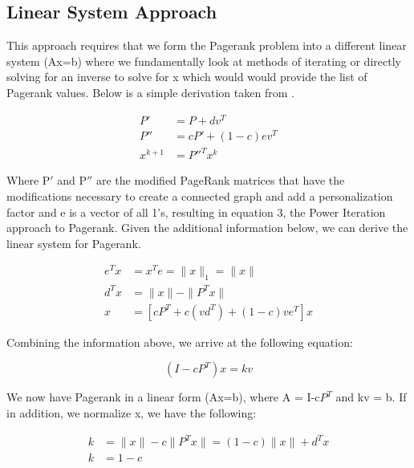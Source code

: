 \documentclass[letterpaper,11pt,onecolumn]{article}
\begin{document}
\subsection{Linear System Approach}
This approach requires that we form the Pagerank problem into a different linear system (Ax=b) where we fundamentally look at methods of iterating or directly solving for an inverse to solve for x which would would provide the list of Pagerank values. Below is a simple derivation taken from \cite{FastParallel}.
\begin{center}
\begin{align}
	P' &= P + dv^{T} \\
	P'' &= cP' + (1-c)ev^{T} \\
	x^{k+1} &= P''^{T}x^{k}
\end{align}

\end{center}
Where P$'$ and P$''$ are the modified PageRank matrices that have the modifications necessary to create a connected graph and add a personalization factor and e is a vector of all 1's, resulting in equation 3, the Power Iteration approach to Pagerank.
\newline
\linebreak
Given the additional information below, we can derive the linear system for Pagerank.


\begin{center}
\begin{align}
  e^{T}x & = x^{T}e = \|x\|_{1} = \|x\| \\
  d^{T}x &= \| x\| - \| P^{T}x\| \\
  x &= [cP^{T} + c(vd^{T}) + (1-c)ve^{T}]x
\end{align}
\end{center}

Combining the information above, we arrive at the following equation:

\begin{center}
\begin{equation}
  (I-cP^{T})x = kv
\end{equation}
\end{center}
We now have Pagerank in a linear form (Ax=b), where A = I-c$P^{T}$ and kv = b. If in addition, we normalize x, we have the following:

\begin{center}
  \begin{align}
	k &= \|x\| - c \|P^{T}x\| = (1-c) \|x\| + d^{T}x \\	
	k &= 1-c 
  \end{align}
\end{center}
\end{document}
